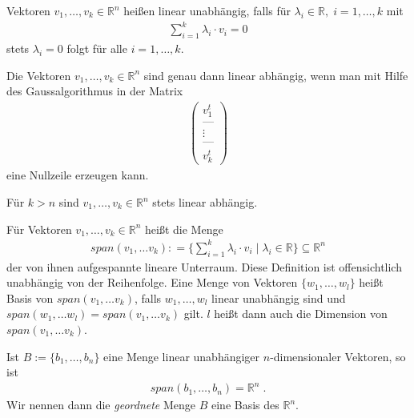 \begin{Definition}
Vektoren $v_1, \hdots ,v_k \in \mathbb{R}^n$ heißen linear unabhängig, falls für $\lambda_i \in \mathbb{R}, \; i=1, \hdots ,k $ mit
\begin{align*}
\sum_{i= 1}^k \lambda_i \cdot v_i = 0
\end{align*} 
stets $\lambda_i = 0$ folgt für alle $i = 1, \hdots, k$. 
\end{Definition}

\begin{Satz}
Die Vektoren $v_1, \hdots ,v_k \in \mathbb{R}^n$ sind genau dann linear abhängig, wenn man 
mit Hilfe des Gaussalgorithmus in der Matrix 
\begin{align*}
\begin{pmatrix}
v_1^t \\   \text{---} \\ \vdots \\  \text{---} \\ v_k^t
\end{pmatrix}
\end{align*}
eine Nullzeile erzeugen kann.
\end{Satz}

\begin{Bemerkung}
Für $k>n$ sind $v_1, \hdots ,v_k \in \mathbb{R}^n$ stets linear abhängig.
\end{Bemerkung}

\begin{Definition}
Für Vektoren $v_1, \hdots , v_k \in \mathbb{R}^n$ heißt die Menge
\begin{align*}
span(v_1, \hdots v_k) : = \biggl\{ \sum_{i=1}^k \lambda_i \cdot v_i \; | \; \lambda_i \in \mathbb{R}  \biggr\} \subseteq \mathbb{R}^n
\end{align*}
der von ihnen aufgespannte lineare Unterraum. Diese Definition ist offensichtlich unabhängig von der Reihenfolge. 
Eine Menge von Vektoren $\{ w_1, \hdots , w_l \}$ heißt Basis von
$span(v_1, \hdots v_k)$, falls $w_1, \hdots , w_l$ linear unabhängig sind und
$span(w_1, \hdots w_l) = span(v_1, \hdots v_k)$ gilt. $l$ heißt dann auch die Dimension von $span(v_1, \hdots v_k)$. 
\end{Definition}


\begin{Satz}
Ist $B:= \{ b_1, \hdots , b_n \}$ eine Menge linear unabhängiger $n$-dimensionaler Vektoren, so ist
\begin{align*}
span(b_1, \hdots ,b_n) = \mathbb{R}^n \; .
\end{align*}
Wir nennen dann die \emph{geordnete} Menge $B$ eine Basis des $\mathbb{R}^n$. 
\end{Satz}


